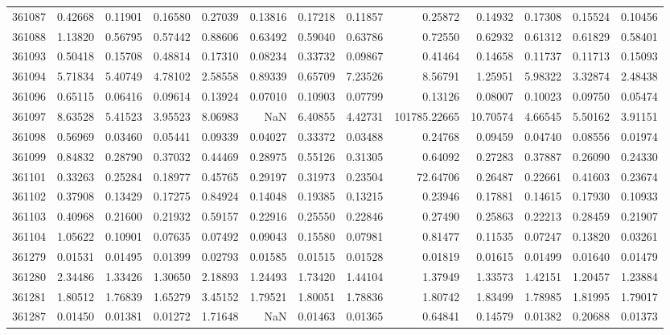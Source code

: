 \begin{tabular}{lrrrrrrrrrrrr}
361087 & 0.42668 & 0.11901 & 0.16580 & 0.27039 & 0.13816 & 0.17218 & 0.11857 & 0.25872 & 0.14932 & 0.17308 & 0.15524 & 0.10456 \\
361088 & 1.13820 & 0.56795 & 0.57442 & 0.88606 & 0.63492 & 0.59040 & 0.63786 & 0.72550 & 0.62932 & 0.61312 & 0.61829 & 0.58401 \\
361093 & 0.50418 & 0.15708 & 0.48814 & 0.17310 & 0.08234 & 0.33732 & 0.09867 & 0.41464 & 0.14658 & 0.11737 & 0.11713 & 0.15093 \\
361094 & 5.71834 & 5.40749 & 4.78102 & 2.58558 & 0.89339 & 0.65709 & 7.23526 & 8.56791 & 1.25951 & 5.98322 & 3.32874 & 2.48438 \\
361096 & 0.65115 & 0.06416 & 0.09614 & 0.13924 & 0.07010 & 0.10903 & 0.07799 & 0.13126 & 0.08007 & 0.10023 & 0.09750 & 0.05474 \\
361097 & 8.63528 & 5.41523 & 3.95523 & 8.06983 & NaN & 6.40855 & 4.42731 & 101785.22665 & 10.70574 & 4.66545 & 5.50162 & 3.91151 \\
361098 & 0.56969 & 0.03460 & 0.05441 & 0.09339 & 0.04027 & 0.33372 & 0.03488 & 0.24768 & 0.09459 & 0.04740 & 0.08556 & 0.01974 \\
361099 & 0.84832 & 0.28790 & 0.37032 & 0.44469 & 0.28975 & 0.55126 & 0.31305 & 0.64092 & 0.27283 & 0.37887 & 0.26090 & 0.24330 \\
361101 & 0.33263 & 0.25284 & 0.18977 & 0.45765 & 0.29197 & 0.31973 & 0.23504 & 72.64706 & 0.26487 & 0.22661 & 0.41603 & 0.23674 \\
361102 & 0.37908 & 0.13429 & 0.17275 & 0.84924 & 0.14048 & 0.19385 & 0.13215 & 0.23946 & 0.17881 & 0.14615 & 0.17930 & 0.10933 \\
361103 & 0.40968 & 0.21600 & 0.21932 & 0.59157 & 0.22916 & 0.25550 & 0.22846 & 0.27490 & 0.25863 & 0.22213 & 0.28459 & 0.21907 \\
361104 & 1.05622 & 0.10901 & 0.07635 & 0.07492 & 0.09043 & 0.15580 & 0.07981 & 0.81477 & 0.11535 & 0.07247 & 0.13820 & 0.03261 \\
361279 & 0.01531 & 0.01495 & 0.01399 & 0.02793 & 0.01585 & 0.01515 & 0.01528 & 0.01819 & 0.01615 & 0.01499 & 0.01640 & 0.01479 \\
361280 & 2.34486 & 1.33426 & 1.30650 & 2.18893 & 1.24493 & 1.73420 & 1.44104 & 1.37949 & 1.33573 & 1.42151 & 1.20457 & 1.23884 \\
361281 & 1.80512 & 1.76839 & 1.65279 & 3.45152 & 1.79521 & 1.80051 & 1.78836 & 1.80742 & 1.83499 & 1.78985 & 1.81995 & 1.79017 \\
361287 & 0.01450 & 0.01381 & 0.01272 & 1.71648 & NaN & 0.01463 & 0.01365 & 0.64841 & 0.14579 & 0.01382 & 0.20688 & 0.01373 \\

\end{tabular}
